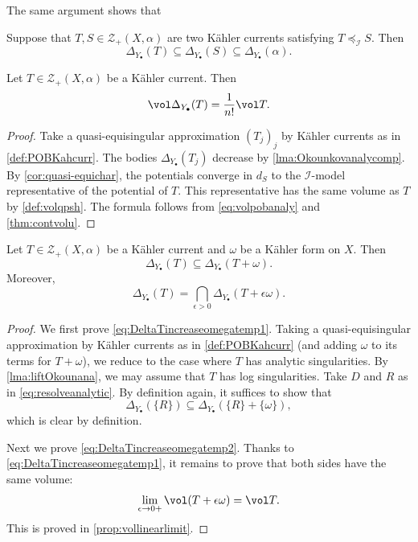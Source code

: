 The same argument shows that
\begin{corollary}\label{cor:Kahlercurrentcase}
    Suppose that $T,S\in \mathcal{Z}_+(X,\alpha)$ are two Kähler currents satisfying $T \preceq_{\mathcal{I}} S$. Then
    \[
    \Delta_{Y_{\bullet}}(T)\subseteq \Delta_{Y_{\bullet}}(S)\subseteq \Delta_{Y_{\bullet}}(\alpha).
    \]
\end{corollary}

\begin{proposition}\label{prop:Okounkov:L1551}
    Let $T\in \mathcal{Z}_+(X,\alpha)$ be a Kähler current. Then
    \begin{equation}\label{eq:volOkocur}
        \vol \Delta_{Y_{\bullet}}(T)=\frac{1}{n!}\vol T.
    \end{equation}
\end{proposition}
\begin{proof}
Take a quasi-equisingular approximation $(T_j)_j$ by Kähler currents as in \cref{def:POBKahcurr}. The bodies $\Delta_{Y_{\bullet}}(T_j)$ decrease by \cref{lma:Okounkovanalycomp}. By \cref{cor:quasi-equichar}, the potentials converge in $d_S$ to the $\mathcal I$-model representative of the potential of $T$. This representative has the same volume as $T$ by \cref{def:volqpsh}. The formula follows from \eqref{eq:volpobanaly} and \cref{thm:contvolu}.
\end{proof}


\begin{lemma}\label{lma:Okomonotone}
    Let $T\in \mathcal{Z}_+(X,\alpha)$ be a Kähler current and $\omega$ be a Kähler form on $X$. Then
    \begin{equation}\label{eq:DeltaTincreaseomegatemp1}
    \Delta_{Y_{\bullet}}(T)\subseteq \Delta_{Y_{\bullet}}(T+\omega).
    \end{equation}
    Moreover,
    \begin{equation}\label{eq:DeltaTincreaseomegatemp2}
    \Delta_{Y_{\bullet}}(T)=\bigcap_{\epsilon>0}\Delta_{Y_{\bullet}}(T+\epsilon\omega).
    \end{equation}
\end{lemma}
\begin{proof}
We first prove \eqref{eq:DeltaTincreaseomegatemp1}.
    Taking a quasi-equisingular approximation by Kähler currents as in \cref{def:POBKahcurr} (and adding $\omega$ to its terms for $T+\omega$), we reduce to the case where $T$ has analytic singularities. By \cref{lma:liftOkounana}, we may assume that $T$ has log singularities.
    Take $D$ and $R$ as in \eqref{eq:resolveanalytic}. By definition again, it suffices to show that
    \[
    \Delta_{Y_{\bullet}}(\{R\})\subseteq \Delta_{Y_{\bullet}}(\{R\}+\{\omega\}),
    \]
    which is clear by definition.

Next we prove \eqref{eq:DeltaTincreaseomegatemp2}. Thanks to \eqref{eq:DeltaTincreaseomegatemp1}, it remains to prove that both sides have the same volume:
\[
\lim_{\epsilon\to 0+}\vol (T+\epsilon\omega)=\vol T.
\]
This is proved in \cref{prop:vollinearlimit}.
\end{proof}

